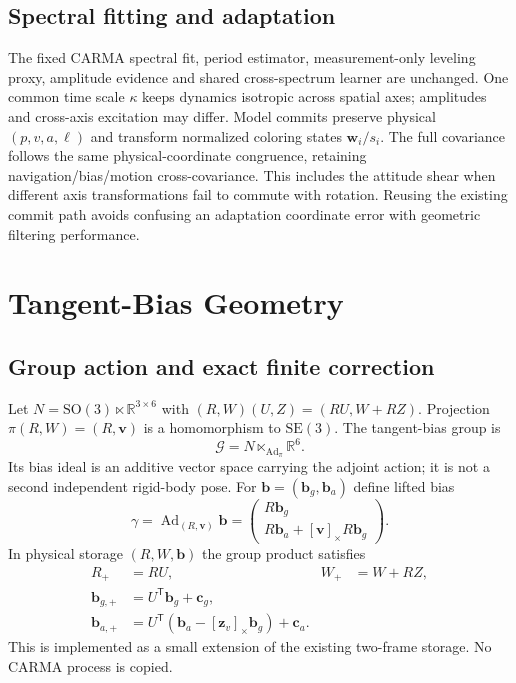 \documentclass[conference]{IEEEtran}
\newcommand{\R}{\mathbb R}
\newcommand{\vc}[1]{\bm{#1}}
\newcommand{\sk}[1]{[#1]_\times}
\newcommand{\tr}{^{\mathsf T}}
\begin{document}
\subsection{Spectral fitting and adaptation}
The fixed CARMA spectral fit, period estimator, measurement-only leveling
proxy, amplitude evidence and shared cross-spectrum learner are unchanged.
One common time scale $\kappa$ keeps dynamics isotropic across spatial axes;
amplitudes and cross-axis excitation may differ. Model commits preserve
physical $(p,v,a,\ell)$ and transform normalized coloring states
$\vc w_i/s_i$. The full covariance follows the same physical-coordinate
congruence, retaining navigation/bias/motion cross-covariance. This includes
the attitude shear when different axis transformations fail to commute with
rotation. Reusing the existing commit path avoids confusing an adaptation
coordinate error with geometric filtering performance.

\section{Tangent-Bias Geometry}
\subsection{Group action and exact finite correction}
Let $N=\mathrm{SO}(3)\ltimes\R^{3\times6}$ with
$(R,W)(U,Z)=(RU,W+RZ)$. Projection $\pi(R,W)=(R,\vc v)$ is a homomorphism
to $\mathrm{SE}(3)$. The tangent-bias group is
\begin{equation}
 \mathcal G=N\ltimes_{\operatorname{Ad}_{\pi}}\R^6.\label{eq:group}
\end{equation}
Its bias ideal is an additive vector space carrying the adjoint action;
it is not a second independent rigid-body pose. For
$\vc b=(\vc b_g,\vc b_a)$ define lifted bias
\begin{equation}
 \gamma=\operatorname{Ad}_{(R,\vc v)}\vc b
 =\begin{pmatrix}R\vc b_g\\R\vc b_a+\sk{\vc v}R\vc b_g\end{pmatrix}.
\end{equation}
In physical storage $(R,W,\vc b)$ the group product satisfies
\begin{align}
 R_+&=RU,&W_+&=W+RZ,\\
 \vc b_{g,+}&=U\tr\vc b_g+\vc c_g,\\
 \vc b_{a,+}&=U\tr(\vc b_a-\sk{\vc z_v}\vc b_g)+\vc c_a.
\end{align}
This is implemented as a small extension of the existing two-frame storage.
No CARMA process is copied.
\end{document}
